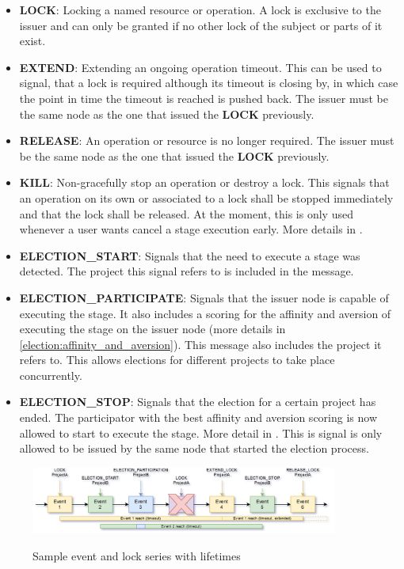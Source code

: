 \begin{itemize}
	\item \textbf{LOCK}: Locking a named resource or operation.
	A lock is exclusive to the issuer and can only be granted if no other lock of the subject or parts of it exist.
	\item \textbf{EXTEND}: Extending an ongoing operation timeout.
	This can be used to signal, that a lock is required although its timeout is closing by, in which case the point in time the timeout is reached is pushed back.
	The issuer must be the same node as the one that issued the \textbf{LOCK} previously.
	\item \textbf{RELEASE}: An operation or resource is no longer required.
	The issuer must be the same node as the one that issued the \textbf{LOCK} previously.
	\item \textbf{KILL}: Non-gracefully stop an operation or destroy a lock.
	This signals that an operation on its own or associated to a lock shall be stopped immediately and that the lock shall be released.
	At the moment, this is only used whenever a user wants cancel a stage execution early. More details in .
	\item \textbf{ELECTION\_START}: Signals that the need to execute a stage was detected.
	The project this signal refers to is included in the message.
	\item \textbf{ELECTION\_PARTICIPATE}: Signals that the issuer node is capable of executing the stage.
	It also includes a scoring for the affinity and aversion of executing the stage on the issuer node (more details in \autoref{election:affinity_and_aversion}).
	This message also includes the project it refers to.
	This allows elections for different projects to take place concurrently.
	\item \textbf{ELECTION\_STOP}: Signals that the election for a certain project has ended.
	The participator with the best affinity and aversion scoring is now allowed to start to execute the stage.
	More detail in .
	This is signal is only allowed to be issued by the same node that started the election process.
\end{itemize}


\begin{figure}[h]
	\includegraphics[width=0.9\textwidth]{events.png}
	\label{winslow:com:events}
	\caption{Sample event and lock series with lifetimes}
\end{figure}

